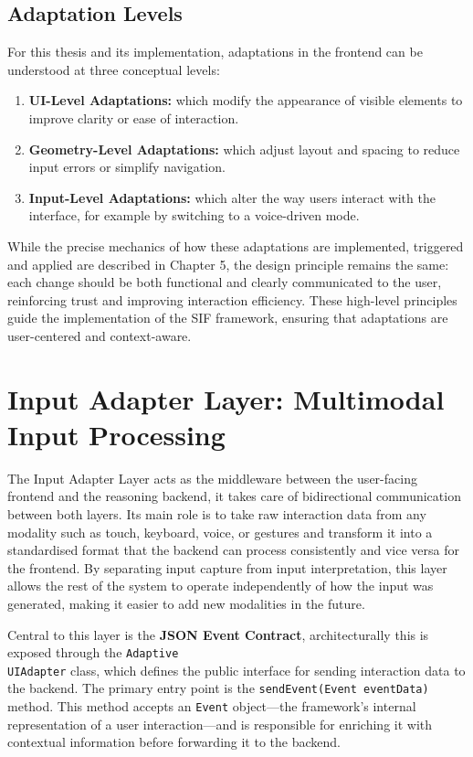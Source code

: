 \documentclass[openany]{book}
\begin{document}
\subsection{Adaptation Levels}
For this thesis and its implementation, adaptations in the frontend can be understood at three conceptual levels:
\begin{enumerate}
    \item \textbf{UI-Level Adaptations:} which modify the appearance of visible elements to improve clarity or ease of interaction.
    \item \textbf{Geometry-Level Adaptations:} which adjust layout and spacing to reduce input errors or simplify navigation.
    \item \textbf{Input-Level Adaptations:} which alter the way users interact with the interface, for example by switching to a voice-driven mode.
\end{enumerate}
While the precise mechanics of how these adaptations are implemented, triggered and applied are described in Chapter 5, the design principle remains the same: each change should be both functional and clearly communicated to the user, reinforcing trust and improving interaction efficiency. These high-level principles guide the implementation of the SIF framework, ensuring that adaptations are user-centered and context-aware.

\section{Input Adapter Layer: Multimodal Input Processing}
The Input Adapter Layer acts as the middleware between the user-facing frontend and the reasoning backend, it takes care of bidirectional communication between both layers. Its main role is to take raw interaction data from any modality such as touch, keyboard, voice, or gestures and transform it into a standardised format that the backend can process consistently and vice versa for the frontend. By separating input capture from input interpretation, this layer allows the rest of the system to operate independently of how the input was generated, making it easier to add new modalities in the future.

Central to this layer is the \textbf{JSON Event Contract}, architecturally this is exposed through the \texttt{Adaptive\\UIAdapter} class, which defines the public interface for sending interaction data to the backend. The primary entry point is the \texttt{sendEvent(Event eventData)} method. This method accepts an \texttt{Event} object—the framework’s internal representation of a user interaction—and is responsible for enriching it with contextual information before forwarding it to the backend.
\end{document}

